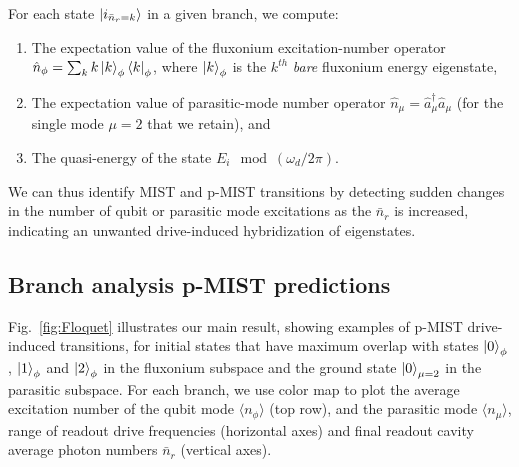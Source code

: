 \documentclass[%
reprint,
superscriptaddress,
 amsmath,amssymb,
 aps,
 prx,
longbibliography,
floatfix,
]{revtex4-2}
\newcommand{\sh}[1]{{\color{blue}{{}[SS: #1]}}}%
\begin{document}
\sh{We make these choices to observe population change in the fluxonium potential, i.e. state transitions, as we ring up the drive powers. Note that, the slower or more adiabatic the ring-up of the drive, more are the chances to observe a state transition. To avoid fairly weak transitions we ring-up the drive using discrete steps of $\delta \bar n_r=1$ which corresponds to a linear increase in the drive powers. This choice uses a drive strength increment size $\delta 
|{\xi}_{\phi (
mu
),r}|= 2g_{
\phi(\mu),r} 
$, different from the driven transmon analysis in Refs.~\cite{dumas2024unified} where $\delta 
|{\xi}_{\phi,r}|\sim \kappa_r$, the readout resonator's decay rate. Thus, our simulations can also be used to understand the impact of parasitic state transitions due to a linearly increasing drive on the fluxonium circuit.
}


For each state $\ket{i_{\bar n_r=k}}$ in a given branch, we compute:
\begin{enumerate}
    \item The expectation value of the fluxonium excitation-number operator $\hat n_\phi=\sum_k k\ket{k}_\phi\bra{k}_\phi$,  where $\ket{k}_\phi$ is the $k^{th}$ {\it bare} fluxonium energy eigenstate,
    \item The expectation value of parasitic-mode number operator $\hat n_\mu=\hat a_{\mu}^\dagger \hat a_{\mu}$ (for the single mode $\mu=2$ that we retain), and 
    \item The quasi-energy of the state $E_i \mod (\omega_d/2\pi)$.
\end{enumerate}
We can thus identify MIST and p-MIST transitions by detecting sudden changes in the number of qubit or parasitic mode excitations as the $\bar{n}_r$ is increased, indicating an unwanted drive-induced hybridization of eigenstates.  


\subsection{Branch analysis p-MIST predictions}

Fig.~\ref{fig:Floquet} illustrates our main result, showing examples of p-MIST drive-induced transitions,   
for initial states that have maximum overlap with states $\ket{0}_\phi$, $\ket{1}_\phi$ and $\ket{2}_\phi$ in the fluxonium subspace and the ground state $\ket{0}_{\mu=2}$ in the parasitic subspace. 
For each branch, we use color map to plot the average excitation number of the qubit mode $\langle n_\phi \rangle$ (top row), and the parasitic mode $\langle n_\mu \rangle$, range of readout drive frequencies (horizontal axes) and final readout cavity average photon numbers $ \bar n_r$ (vertical axes). 
\end{document}
